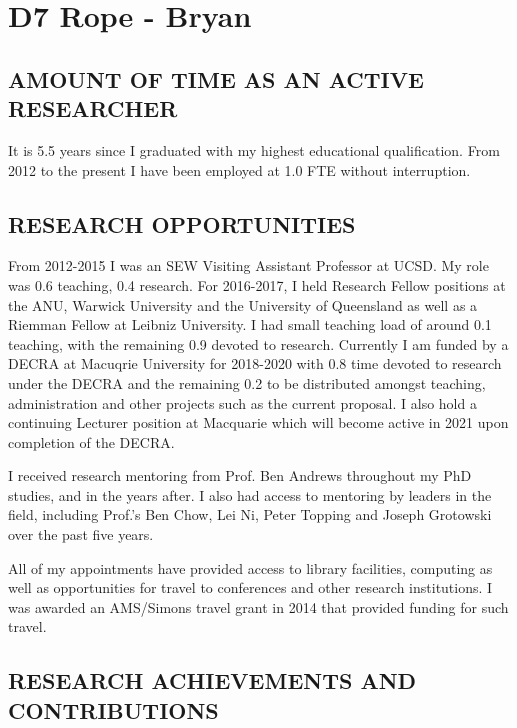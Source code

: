 \documentclass[12pt]{article}
\author{Paul Bryan}
\date{}
\title{}
\begin{document}
\section*{D7 Rope - Bryan}
\label{sec:orga46faa9}

\subsection*{AMOUNT OF TIME AS AN ACTIVE RESEARCHER}
\label{sec:org71b965b}

It is 5.5 years since I graduated with my highest educational qualification. From 2012 to the present I have been employed at 1.0 FTE without interruption. 

\subsection*{RESEARCH OPPORTUNITIES}
\label{sec:orgb57b1c4}

From 2012-2015 I was an SEW Visiting Assistant Professor at UCSD. My role was 0.6 teaching, 0.4 research. For 2016-2017, I held Research Fellow positions at the ANU, Warwick University and the University of Queensland as well as a Riemman Fellow at Leibniz University. I had small teaching load of around 0.1 teaching, with the remaining 0.9 devoted to research. Currently I am funded by a DECRA at Macuqrie University for 2018-2020 with 0.8 time devoted to research under the DECRA and the remaining 0.2 to be distributed amongst teaching, administration and other projects such as the current proposal. I also hold a continuing Lecturer position at Macquarie which will become active in 2021 upon completion of the DECRA.

I received research mentoring from Prof. Ben Andrews throughout my PhD studies, and in the years after. I also had access to mentoring by leaders in the field, including Prof.'s Ben Chow, Lei Ni, Peter Topping and Joseph Grotowski over the past five years.

All of my appointments have provided access to library facilities, computing as well as opportunities for travel to conferences and other research institutions. I was awarded an AMS/Simons travel grant in 2014 that provided funding for such travel.

\subsection*{RESEARCH ACHIEVEMENTS AND CONTRIBUTIONS}
\label{sec:org5d9c0ea}
\end{document}
